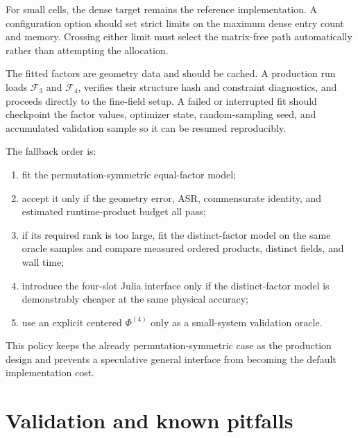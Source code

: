 \documentclass{article}
\begin{document}
For small cells, the dense target remains the reference implementation. A
configuration option should set strict limits on the maximum dense entry
count and memory. Crossing either limit must select the matrix-free path
automatically rather than attempting the allocation.

The fitted factors are geometry data and should be cached. A production run
loads $\mathcal F_3$ and $\mathcal F_4$, verifies their structure hash and
constraint diagnostics, and proceeds directly to the fine-field setup. A
failed or interrupted fit should checkpoint the factor values, optimizer
state, random-sampling seed, and accumulated validation sample so it can be
resumed reproducibly.

The fallback order is:
\begin{enumerate}
    \item fit the permutation-symmetric equal-factor model;
    \item accept it only if the geometry error, ASR, commensurate identity,
    and estimated runtime-product budget all pass;
    \item if its required rank is too large, fit the distinct-factor model
    on the same oracle samples and compare measured ordered products,
    distinct fields, and wall time;
    \item introduce the four-slot Julia interface only if the distinct-factor
    model is demonstrably cheaper at the same physical accuracy;
    \item use an explicit centered $\Phi^{(4)}$ only as a small-system
    validation oracle.
\end{enumerate}
This policy keeps the already permutation-symmetric case as the production
design and prevents a speculative general interface from becoming the
default implementation cost.

\section{Validation and known pitfalls}
\label{sec:validation}
\end{document}
